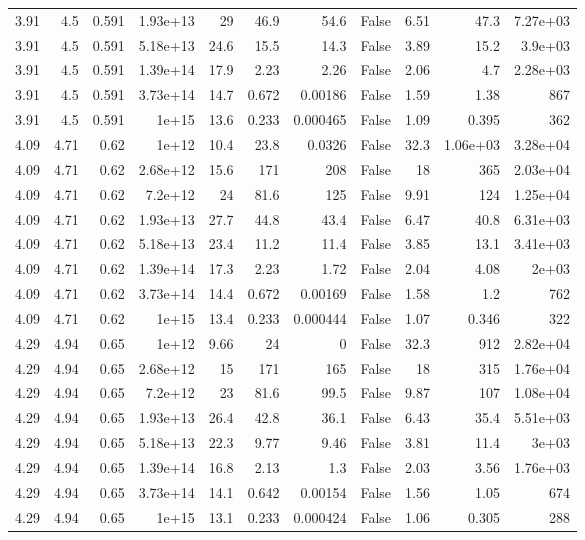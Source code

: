 \begin{table}
\begin{tabular}{rrrrrrrrrrr}
3.91 & 4.5 & 0.591 & 1.93e+13 & 29 & 46.9 & 54.6 & False & 6.51 & 47.3 & 7.27e+03 \\
3.91 & 4.5 & 0.591 & 5.18e+13 & 24.6 & 15.5 & 14.3 & False & 3.89 & 15.2 & 3.9e+03 \\
3.91 & 4.5 & 0.591 & 1.39e+14 & 17.9 & 2.23 & 2.26 & False & 2.06 & 4.7 & 2.28e+03 \\
3.91 & 4.5 & 0.591 & 3.73e+14 & 14.7 & 0.672 & 0.00186 & False & 1.59 & 1.38 & 867 \\
3.91 & 4.5 & 0.591 & 1e+15 & 13.6 & 0.233 & 0.000465 & False & 1.09 & 0.395 & 362 \\
4.09 & 4.71 & 0.62 & 1e+12 & 10.4 & 23.8 & 0.0326 & False & 32.3 & 1.06e+03 & 3.28e+04 \\
4.09 & 4.71 & 0.62 & 2.68e+12 & 15.6 & 171 & 208 & False & 18 & 365 & 2.03e+04 \\
4.09 & 4.71 & 0.62 & 7.2e+12 & 24 & 81.6 & 125 & False & 9.91 & 124 & 1.25e+04 \\
4.09 & 4.71 & 0.62 & 1.93e+13 & 27.7 & 44.8 & 43.4 & False & 6.47 & 40.8 & 6.31e+03 \\
4.09 & 4.71 & 0.62 & 5.18e+13 & 23.4 & 11.2 & 11.4 & False & 3.85 & 13.1 & 3.41e+03 \\
4.09 & 4.71 & 0.62 & 1.39e+14 & 17.3 & 2.23 & 1.72 & False & 2.04 & 4.08 & 2e+03 \\
4.09 & 4.71 & 0.62 & 3.73e+14 & 14.4 & 0.672 & 0.00169 & False & 1.58 & 1.2 & 762 \\
4.09 & 4.71 & 0.62 & 1e+15 & 13.4 & 0.233 & 0.000444 & False & 1.07 & 0.346 & 322 \\
4.29 & 4.94 & 0.65 & 1e+12 & 9.66 & 24 & 0 & False & 32.3 & 912 & 2.82e+04 \\
4.29 & 4.94 & 0.65 & 2.68e+12 & 15 & 171 & 165 & False & 18 & 315 & 1.76e+04 \\
4.29 & 4.94 & 0.65 & 7.2e+12 & 23 & 81.6 & 99.5 & False & 9.87 & 107 & 1.08e+04 \\
4.29 & 4.94 & 0.65 & 1.93e+13 & 26.4 & 42.8 & 36.1 & False & 6.43 & 35.4 & 5.51e+03 \\
4.29 & 4.94 & 0.65 & 5.18e+13 & 22.3 & 9.77 & 9.46 & False & 3.81 & 11.4 & 3e+03 \\
4.29 & 4.94 & 0.65 & 1.39e+14 & 16.8 & 2.13 & 1.3 & False & 2.03 & 3.56 & 1.76e+03 \\
4.29 & 4.94 & 0.65 & 3.73e+14 & 14.1 & 0.642 & 0.00154 & False & 1.56 & 1.05 & 674 \\
4.29 & 4.94 & 0.65 & 1e+15 & 13.1 & 0.233 & 0.000424 & False & 1.06 & 0.305 & 288 \\

\end{tabular}
\end{table}
